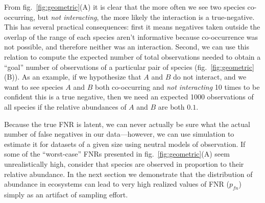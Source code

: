 \documentclass[10pt,oneside]{article}
\begin{document}
From fig.~\ref{fig:geometric}(A) it is clear that the more often we see
two species co-occurring, but \emph{not interacting}, the more likely
the interaction is a true-negative. This has several practical
consequences: first it means negatives taken outside the overlap of the
range of each species aren't informative because co-occurrence was not
possible, and therefore neither was an interaction. Second, we can use
this relation to compute the expected number of total observations
needed to obtain a ``goal'' number of observations of a particular pair
of species (fig.~\ref{fig:geometric}(B)). As an example, if we
hypothesize that \(A\) and \(B\) do not interact, and we want to see
species \(A\) and \(B\) both co-occurring and \emph{not interacting} 10
times to be confident this is a true negative, then we need an expected
1000 observations of all species if the relative abundances of \(A\) and
\(B\) are both \(0.1\).

Because the true FNR is latent, we can never actually be sure what the
actual number of false negatives in our data---however, we can use
simulation to estimate it for datasets of a given size using neutral
models of observation. If some of the ``worst-case'' FNRs presented in
fig.~\ref{fig:geometric}(A) seem unrealistically high, consider that
species are observed in proportion to their relative abundance. In the
next section we demonstrate that the distribution of abundance in
ecosystems can lead to very high realized values of FNR (\(p_{fn}\))
simply as an artifact of sampling effort.
\end{document}
